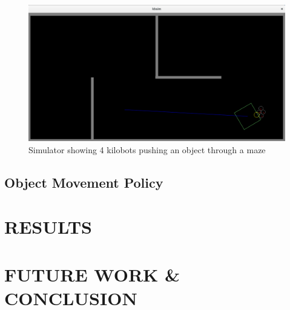 \documentclass[twoside]{article}
\begin{document}
\begin{figure}[!htb]
    \centering
    \includegraphics[width=0.9\linewidth]{figures/simulator_maze.png}
    \caption{Simulator showing 4 kilobots pushing an object through a maze}
    \label{fig:simulator}
\end{figure}

\subsection{Object Movement Policy}
\label{sec:objpolicy}



\section{RESULTS}

\section{FUTURE WORK \& CONCLUSION}




\end{document}
